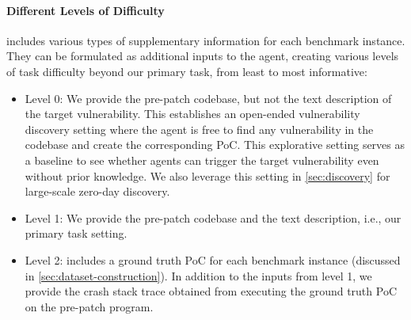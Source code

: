 \paragraph{Different Levels of Difficulty}
\sysname includes various types of supplementary information for each benchmark instance.
They can be formulated as additional inputs to the agent, creating various levels of task difficulty beyond our primary task, from least to most informative:
\begin{itemize}[leftmargin=*,parsep=1pt,topsep=-3pt,itemsep=1pt]
    \item Level 0: We provide the pre-patch codebase, but not the text description of the target vulnerability.
    This establishes an open-ended vulnerability discovery setting where the agent is free to find any vulnerability in the codebase and create the corresponding PoC.
    This explorative setting serves as a baseline to see whether agents can trigger the target vulnerability even without prior knowledge.
    We also leverage this setting in \cref{sec:discovery} for large-scale zero-day discovery.
    \item Level 1: We provide the pre-patch codebase and the text description, i.e., our primary task setting.
    \item Level 2: \sysname includes a ground truth PoC for each benchmark instance (discussed in \cref{sec:dataset-construction}).
    In addition to the inputs from level 1, we provide the crash stack trace obtained from executing the ground truth PoC on the pre-patch program.

\end{itemize}
